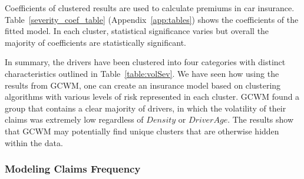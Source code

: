 \documentclass[11pt,letterpaper]{article}
\numberwithin{equation}{section}
\numberwithin{equation}{section}
\numberwithin{equation}{section}
\begin{document}
Coefficients of clustered results are used to calculate premiums in car insurance. Table~\ref{severity_coef_table} (Appendix~\ref{app:tables}) shows the coefficients of the fitted model. In each cluster, statistical significance varies but overall the majority of coefficients are statistically significant.

In summary, the drivers have been clustered into four categories with distinct characteristics outlined in Table~\ref{table:volSev}. We have seen how using the results from GCWM, one can create an insurance model based on clustering algorithms with various levels of risk represented in each cluster. GCWM found a group that contains a clear majority of drivers, in which the volatility of their claims was extremely low regardless of $Density$ or $DriverAge$. The results show that GCWM may potentially find unique clusters that are otherwise hidden within the data.


 \subsubsection{Modeling Claims Frequency}
\end{document}
